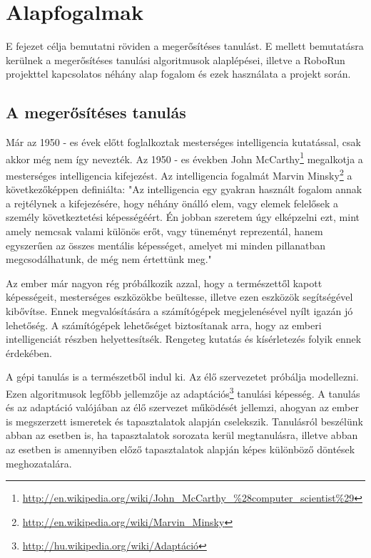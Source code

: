 \chapter{Alapfogalmak}\label{ch:ALAPFOGALMAK}

\begin{osszefoglal}
	E fejezet célja bemutatni röviden a megerősítéses tanulást. E mellett bemutatásra kerülnek a megerősítéses tanulási algoritmusok alaplépései, illetve a RoboRun projekttel kapcsolatos néhány alap fogalom és ezek használata a projekt során.
\end{osszefoglal}

\section{A megerősítéses tanulás}\label{sec:MEGEROSITESESTANULAS}
Már az 1950 - es évek előtt foglalkoztak mesterséges intelligencia kutatással, csak akkor még nem így nevezték. Az 1950 - es években John McCarthy\footnote{\href {http://en.wikipedia.org/wiki/Marvin_Minsky}{http://en.wikipedia.org/wiki/John\_McCarthy\_\%28computer\_scientist\%29}} megalkotja a mesterséges intelligencia kifejezést. Az intelligencia fogalmát Marvin Minsky\footnote{\href {http://en.wikipedia.org/wiki/Marvin\_Minsky}{http://en.wikipedia.org/wiki/Marvin\_Minsky}} a következőképpen definiálta: "Az intelligencia egy gyakran használt fogalom annak a rejtélynek a kifejezésére, hogy néhány önálló elem, vagy elemek felelősek a személy következtetési képességéért. Én jobban szeretem úgy elképzelni ezt, mint amely nemcsak valami különös erőt, vagy tüneményt reprezentál, hanem egyszerűen az összes mentális képességet, amelyet mi minden pillanatban megcsodálhatunk, de még nem értettünk meg." 
	
	Az ember már nagyon rég próbálkozik azzal, hogy a természettől kapott képességeit, mesterséges eszközökbe beültesse, illetve ezen eszközök segítségével kibővítse. Ennek megvalósítására a számítógépek megjelenésével nyílt igazán jó lehetőség. A számítógépek lehetőséget biztosítanak arra, hogy az emberi intelligenciát részben helyettesítsék. Rengeteg kutatás és kísérletezés folyik ennek érdekében.	
	
	A gépi tanulás is a természetből indul ki. Az élő szervezetet próbálja modellezni. Ezen algoritmusok legfőbb jellemzője az adaptációs\footnote{\href {http://hu.wikipedia.org/wiki/Adaptáció}{http://hu.wikipedia.org/wiki/Adaptáció}} tanulási képesség. A tanulás és az adaptáció valójában az élő szervezet működését jellemzi, ahogyan az ember is megszerzett ismeretek és tapasztalatok alapján cselekszik. Tanulásról beszélünk abban az esetben is, ha tapasztalatok sorozata kerül megtanulásra, illetve abban az esetben is amennyiben előző tapasztalatok alapján képes különböző döntések meghozatalára. 
	
